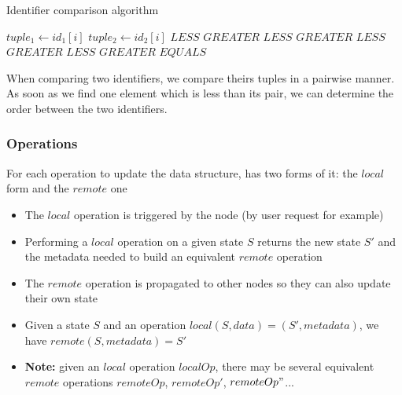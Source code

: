 \documentclass[a4paper]{article}
\begin{document}
\begin{algorithm}
  \caption{Identifier comparison algorithm}\label{alg:compare-ids}
  \begin{algorithmic}
        \State $tuple_1 \gets id_1[i]$
        \State $tuple_2 \gets id_2[i]$
          \State \Return $LESS$
          \State \Return $GREATER$
          \State \Return $LESS$
          \State \Return $GREATER$
          \State \Return $LESS$
          \State \Return $GREATER$
        \EndIf
      \EndFor
        \State \Return $LESS$
        \State \Return $GREATER$
      \EndIf
      \State \Return $EQUALS$
    \EndFunction
  \end{algorithmic}
\end{algorithm}

When comparing two identifiers, we compare theirs tuples in a pairwise manner.
As soon as we find one element which is less than its pair,
we can determine the order between the two identifiers.

\subsubsection{Operations}

For each operation to update the data structure, has two forms of it: the $local$ form and the $remote$ one
\begin{itemize}
  \item The $local$ operation is triggered by the node (by user request for example)
  \item Performing a $local$ operation on a given state $S$
    returns the new state $S'$ and the metadata needed to build an equivalent $remote$ operation
  \item The $remote$ operation is propagated to other nodes so they can also update their own state
  \item Given a state $S$ and an operation $local(S, data) = (S', metadata)$, we have $remote(S, metadata) = S'$
  \item \textbf{Note: } given an $local$ operation $localOp$, there may be several equivalent $remote$ operations $remoteOp$, $remoteOp'$, $remoteOp"$...
\end{itemize}
\end{document}
